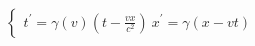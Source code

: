 \documentclass[preview]{standalone}
\begin{document}
\begin{align*}
\begin{cases} t^\prime = \gamma(v) \left(t - \frac{vx}{c^2}\right) \ x^\prime = \gamma (x-vt) \end{cases}
\end{align*}
\end{document}
